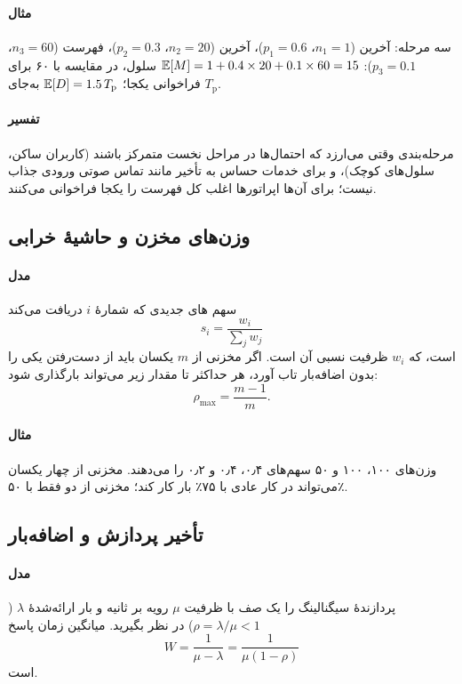 \documentclass[11pt,a4paper]{article}
\begin{document}
\paragraph{مثال} سه مرحله: آخرین  ($n_1 = 1$، $p_1 = 0.6$)، آخرین  ($n_2 = 20$، $p_2 = 0.3$)، فهرست
 ($n_3 = 60$، $p_3 = 0.1$): $\mathbb{E}[M] = 1 + 0.4\times20 + 0.1\times60 = 15$ سلول، در مقایسه با ۶۰ برای فراخوانی
یکجا؛ $\mathbb{E}[D] = 1.5\,T_\mathrm{p}$ به‌جای $T_\mathrm{p}$.
\paragraph{تفسیر} مرحله‌بندی وقتی می‌ارزد که احتمال‌ها در مراحل نخست متمرکز باشند (کاربران ساکن، سلول‌های کوچک)، و برای
خدمات حساس به تأخیر مانند تماس صوتی ورودی جذاب نیست؛ برای آن‌ها اپراتورها اغلب کل فهرست را یکجا فراخوانی می‌کنند.

\subsection{وزن‌های مخزن و حاشیهٔ خرابی}\label{sec:pool}
\paragraph{مدل} سهم های جدیدی که  شمارهٔ $i$ دریافت می‌کند
\begin{equation}\label{eq:weight}
  s_i = \frac{w_i}{\sum_j w_j}
\end{equation}
است، که $w_i$ ظرفیت نسبی آن است. اگر مخزنی از $m$  یکسان باید از دست‌رفتن یکی را بدون اضافه‌بار تاب آورد،
هر  حداکثر تا مقدار زیر می‌تواند بارگذاری شود:
\begin{equation}\label{eq:pool}
  \rho_{\max} = \frac{m-1}{m}.
\end{equation}
\paragraph{مثال} وزن‌های ۱۰۰، ۱۰۰ و ۵۰ سهم‌های ۰٫۴، ۰٫۴ و ۰٫۲ را می‌دهند. مخزنی از چهار  یکسان می‌تواند در کار
عادی با ۷۵٪ بار کار کند؛ مخزنی از دو  فقط با ۵۰٪.

\subsection{تأخیر پردازش و اضافه‌بار}\label{sec:mm1}
\paragraph{مدل} پردازندهٔ سیگنالینگ  را یک صف  با ظرفیت $\mu$ رویه بر ثانیه و بار ارائه‌شدهٔ $\lambda$
($\rho = \lambda/\mu < 1$) در نظر بگیرید. میانگین زمان پاسخ
\begin{equation}\label{eq:mm1}
  W = \frac{1}{\mu-\lambda} = \frac{1}{\mu(1-\rho)}
\end{equation}
است.
\end{document}
